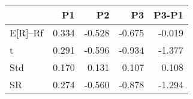 \begin{tabular}{lrrrr}
\toprule
 & P1 & P2 & P3 & P3-P1 \\
\midrule
E[R]--Rf & 0.334 & -0.528 & -0.675 & -0.019 \\
t & 0.291 & -0.596 & -0.934 & -1.377 \\
Std & 0.170 & 0.131 & 0.107 & 0.108 \\
SR & 0.274 & -0.560 & -0.878 & -1.294 \\
\bottomrule
\end{tabular}
